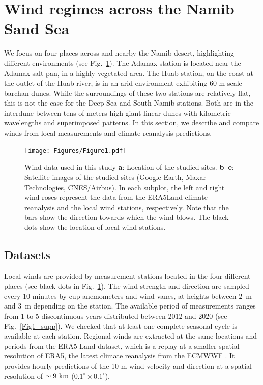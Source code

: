 \section{Wind regimes across the Namib Sand Sea}

  We focus on four places across and nearby the Namib desert, highlighting different environments (see Fig.~\ref{Fig1}).
  The Adamax station is located near the Adamax salt pan, in a highly vegetated area. The Huab station, on the coast at the outlet of the Huab river, is in an arid environment exhibiting $60$-m scale barchan dunes. While the surroundings of these two stations are relatively flat, this is not the case for the Deep Sea and South Namib stations. Both are in the interdune between tens of meters high giant linear dunes with kilometric wavelengths and superimposed patterns. In this section, we describe and compare winds from local measurements and climate reanalysis predictions.

  \begin{figure}
    \centering
    \texttt{[image: Figures/Figure1.pdf]}
    \caption{Wind data used in this study \textbf{a}: Location of the studied sites. \textbf{b--e}: Satellite images of the studied sites (Google-Earth, Maxar Technologies, CNES/Airbus). In each subplot, the left and right wind roses represent the data from the ERA5Land climate reanalysis and the local wind stations, respectively. Note that the bars show the direction towards which the wind blows. The black dots show the location of local wind stations.}
    \label{Fig1}
  \end{figure}

  \subsection{Datasets}

  Local winds are provided by measurement stations located in the four different places (see black dots in Fig.~\ref{Fig1}). The wind strength and direction are sampled every 10 minutes by cup anemometers and wind vanes, at heights between $2$~m and $3$~m depending on the station. The available period of measurements ranges from 1 to 5 discontinuous years distributed between 2012 and 2020 (see Fig.~\ref{Fig1_supp}). We checked that at least one complete seasonal cycle is available at each station.
  Regional winds are extracted at the same locations and periods from the ERA5-Land dataset, which is a replay at a smaller spatial resolution of ERA5, the latest climate reanalysis from the ECMWWF \citep{Hersbach2020, munoz2021}. It provides hourly predictions of the 10-m wind velocity and direction at a spatial resolution of $\sim 9~\textup{km}$ ($0.1^\circ\times0.1^\circ$).


